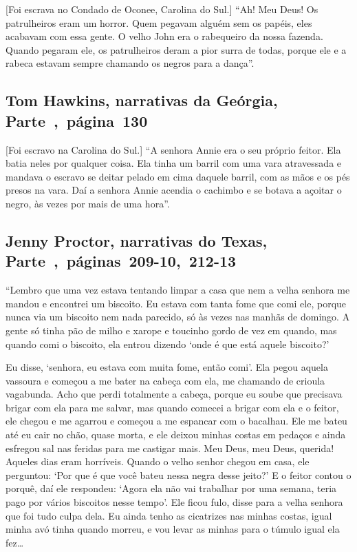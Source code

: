 {[}Foi escrava no Condado de Oconee, Carolina do Sul.{]} ``Ah! Meu Deus! Os patrulheiros eram um horror. Quem pegavam alguém sem
os papéis, eles acabavam com essa gente. O velho John era o rabequeiro
da nossa fazenda. Quando pegaram ele, os patrulheiros deram a pior surra
de todas, porque ele e a rabeca estavam sempre chamando os negros para a
dança''.

\subsection{Tom Hawkins, narrativas da Geórgia, Parte~,~página~130}
\label{ref125}

{[}Foi escravo na Carolina do Sul.{]} ``A senhora Annie era o seu próprio feitor. Ela batia neles por qualquer
coisa. Ela tinha um barril com uma vara atravessada e mandava o escravo
se deitar pelado em cima daquele barril, com as mãos e os pés presos na
vara. Daí a senhora Annie acendia o cachimbo e se botava a açoitar o
negro, às vezes por mais de uma hora''.

\subsection{Jenny Proctor, narrativas do Texas, Parte~,~páginas~209-10,~212-13}
\label{ref217}

``Lembro que uma vez estava tentando limpar a casa que nem a velha
senhora me mandou e encontrei um biscoito. Eu estava com tanta fome que
comi ele, porque nunca via um biscoito nem nada parecido, só às vezes
nas manhãs de domingo. A gente só tinha pão de milho e xarope e toucinho
gordo de vez em quando, mas quando comi o biscoito, ela entrou dizendo
`onde é que está aquele biscoito?'

Eu disse, `senhora, eu estava com muita fome, então comi'. Ela pegou
aquela vassoura e começou a me bater na cabeça com ela, me chamando de
crioula vagabunda. Acho que perdi totalmente a cabeça, porque eu soube
que precisava brigar com ela para me salvar, mas quando comecei a brigar
com ela e o feitor, ele chegou e me agarrou e começou a me espancar com
o bacalhau. Ele me bateu até eu cair no chão, quase morta, e ele deixou
minhas costas em pedaços e ainda esfregou sal nas feridas para me
castigar mais. Meu Deus, meu Deus, querida! Aqueles dias eram horríveis.
Quando o velho senhor chegou em casa, ele perguntou: `Por que é que você
bateu nessa negra desse jeito?' E o feitor contou o porquê, daí ele
respondeu: `Agora ela não vai trabalhar por uma semana, teria pago por
vários biscoitos nesse tempo'. Ele ficou fulo, disse para a velha
senhora que foi tudo culpa dela. Eu ainda tenho as cicatrizes nas minhas
costas, igual minha avó tinha quando morreu, e vou levar as minhas para
o túmulo igual ela fez\ldots{}

